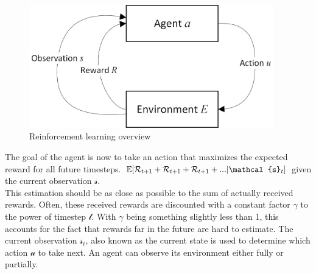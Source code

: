 \begin{figure}[H]
	\centering
	\includegraphics[width=300pt]{images/rl_overview.png}
	\caption{Reinforcement learning overview}
\end{figure}
The goal of the agent is now to take an action that maximizes the expected reward for all future timesteps. $\EX[\mathcal{R}_{t+1}+\mathcal{R}_{t+1}+\mathcal{R}_{t+1}+...|\mathcal{s}_{t}]$ given the current observation $\mathcal{s}$.\\
This estimation should be as close as possible to the sum of actually received rewards. Often, these received rewards are discounted with a constant factor $\mathcal{\gamma}$ to the power of timestep $\mathcal{t}$. With $\mathcal{\gamma}$ being something slightly less than 1, this accounts for the fact that rewards far in the future are hard to estimate.
The current observation $\mathcal{s}_{t}$, also known as the current state is used to determine which action $\mathcal{u}$ to take next. An agent can observe its environment either fully or partially.
